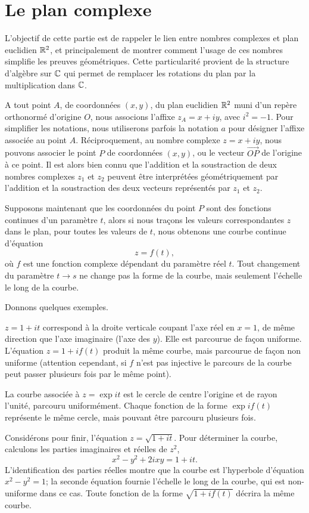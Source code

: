 \chapter{Le plan complexe}

L'objectif de cette partie est de rappeler le lien entre nombres complexes et plan euclidien $\mathbb R^2$, et principalement de montrer comment l'usage de ces nombres simplifie les preuves géométriques. Cette particularité provient de la structure d'algèbre sur $\mathbb{C}$ qui permet de remplacer les rotations du plan par la multiplication dans $\mathbb{C}$.

A tout point $A$, de coordonnées $(x,y)$, du plan euclidien $\mathbb R^2$ muni d'un repère orthonormé d'origine $O$, nous associons l'affixe $z_A=x+ i y$, avec $i^2=-1$. Pour simplifier les notations, nous utiliserons parfois la notation $a$ pour désigner l'affixe associée au point $A$. Réciproquement, au nombre complexe $z=x+iy$, nous pouvons associer le point $P$ de coordonnées $(x,y)$, ou le vecteur $\stackrel{\longrightarrow}{OP}$ de l'origine à ce point. Il est alors bien connu que l'addition et la soustraction de deux nombres complexes $z_1$ et $z_2$ peuvent être interprétées géométriquement par l'addition et la soustraction des deux vecteurs représentés par $z_1$ et $z_2$. 

Supposons maintenant que les coordonnées du point $P$ sont des fonctions continues d'un paramètre $t$, alors si nous traçons les valeurs correspondantes $z$ dans le plan, pour toutes les valeurs de $t$, nous obtenons une courbe continue d'équation
$$z=f(t),$$
où $f$ est une fonction complexe dépendant du paramètre réel $t$. Tout changement du paramètre $t \rightarrow s$ ne change pas la forme de la courbe, mais seulement l'échelle le long de la courbe. 

Donnons quelques exemples. 
\begin{MYenumerate}
\item $z=1+i t$ correspond à la droite verticale coupant l'axe réel en $x=1$, de même direction que l'axe imaginaire (l'axe des $y$). Elle est parcourue de façon uniforme. L'équation $z=1+i f(t)$ produit la même courbe, mais parcourue de façon non uniforme (attention cependant, si $f$ n'est pas injective le parcours de la courbe peut passer plusieurs fois par le même point).
\item La courbe associée à $z=\exp{i t}$ est le cercle de centre l'origine et de rayon l'unité, parcouru uniformément. Chaque fonction de la forme $\exp{i f(t)}$ représente le même cercle, mais pouvant être parcouru plusieurs fois.  
\item Considérons pour finir, l'équation $z=\sqrt{1+ i t}$. Pour déterminer la courbe, calculons les parties imaginaires et réelles de $z^2$,
$$x^2-y^2 + 2 i xy=1+i t.$$
L'identification des parties réelles montre que la courbe est l'hyperbole d'équation $x^2-y^2=1$; la seconde équation fournie l'échelle le long de la courbe, qui est non-uniforme dans ce cas. Toute fonction de la forme $\sqrt{1+i f(t)}$ décrira la même courbe. 
\end{MYenumerate}

